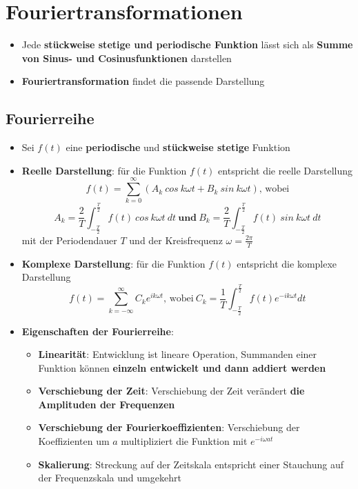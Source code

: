 \section{Fouriertransformationen}%
\label{four:sec:fouriertransformationen}

\begin{itemize}
	\item Jede \textbf{stückweise stetige und periodische Funktion} lässt sich als \textbf{Summe von Sinus- und Cosinusfunktionen} darstellen
	\item \textbf{Fouriertransformation} findet die passende Darstellung
\end{itemize}

\subsection{Fourierreihe}%
\label{four:sub:fourierreihe}

\begin{itemize}
	\item Sei $f(t)$ eine \textbf{periodische} und \textbf{stückweise stetige} Funktion
	\item \textbf{Reelle Darstellung}: für die Funktion $f(t)$ entspricht die reelle Darstellung
	$$f(t) = \sum^\infty_{k=0}(A_k\ cos\ k\omega t + B_k\ sin\ k\omega t)\text{, wobei}$$
	$$A_k = \frac{2}{T}\int^{\frac{T}{2}}_{-\frac{T}{2}}f(t)\ cos\ k\omega t\ dt\ \mathbf{und}\ B_k = \frac{2}{T}\int^{\frac{T}{2}}_{-\frac{T}{2}}f(t)\ sin\ k\omega t\ dt$$
	mit der Periodendauer $T$ und der Kreisfrequenz $\omega = \frac{2\pi}{T}$
	\item \textbf{Komplexe Darstellung}: für die Funktion $f(t)$ entspricht die komplexe Darstellung
	$$f(t) = \sum^\infty_{k=-\infty}C_ke^{ik\omega t}\text{, wobei}\ C_k = \frac{1}{T}\int^{\frac{T}{2}}_{-\frac{T}{2}}f(t)e^{-ik\omega t}dt$$
	\item \textbf{Eigenschaften der Fourierreihe}:
	\begin{itemize}
		\item \textbf{Linearität}: Entwicklung ist lineare Operation, Summanden einer Funktion können \textbf{einzeln entwickelt und dann addiert werden}
		\item \textbf{Verschiebung der Zeit}: Verschiebung der Zeit verändert \textbf{die Amplituden der Frequenzen}
		\item \textbf{Verschiebung der Fourierkoeffizienten}: Verschiebung der Koeffizienten um $a$ multipliziert die Funktion mit $e^{-i\omega at}$
		\item \textbf{Skalierung}: Streckung auf der Zeitskala entspricht einer Stauchung auf der Frequenzskala und umgekehrt
	\end{itemize}
\end{itemize}

